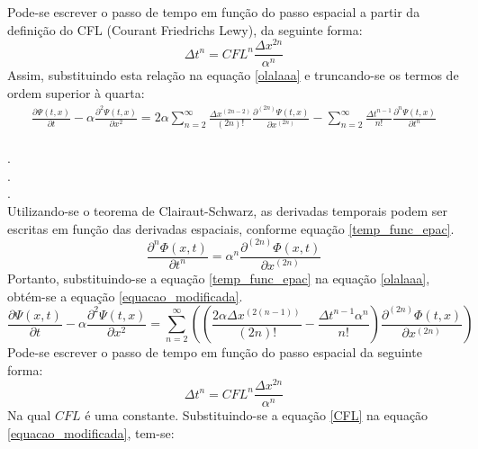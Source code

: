 \documentclass[10pt,twoside,a4paper]{article}
\begin{document}
Pode-se escrever o passo de tempo em função do passo espacial a partir da definição do CFL (Courant Friedrichs Lewy), da seguinte forma:
\begin{equation} \label{CFL}
\Delta t^n= CFL^n \frac{\Delta x^{2n}}{\alpha^{n}}
\end{equation}
Assim, substituindo esta relação na equação \ref{olalaaa} e truncando-se os termos de ordem superior à quarta:
\begin{equation}\label{final mod}
\begin{split}
\frac{\partial \Psi \left(t, x\right) }{\partial t} -
\alpha \frac{\partial^2 \Psi \left(t, x\right) }{\partial x^2} 
= 
2 \alpha \sum\limits_{n=2}^{\infty} \frac{\Delta x^{\left(2n - 2\right)}}{\left(2n\right)!} \frac{\partial^{\left(2n\right)} \Psi \left(t, x\right)}{\partial x^{\left(2n\right)}}
- \sum\limits_{n=2}^{\infty} \frac{\Delta t^{n - 1}}{n!} \frac{\partial^{n} \Psi (t , x)}{\partial t^{n}}	
\end{split}
\end{equation}
\\
. \\ 
. \\
. \\
Utilizando-se o teorema de Clairaut-Schwarz, as derivadas temporais podem ser escritas em função das derivadas espaciais, conforme equação \ref{temp_func_epac}.
\begin{equation} \label{temp_func_epac}
\frac{\partial^{n} \Phi \left( x,t \right)}{\partial t^{n}} =  \alpha^{n} \frac{\partial^{\left(2n\right)} \Phi \left( x,t \right)}{\partial x^{\left(2n\right)}}
\end{equation}
Portanto, substituindo-se a equação \ref{temp_func_epac} na equação \ref{olalaaa}, obtém-se a equação \ref{equacao_modificada}.
\begin{equation} \label{equacao_modificada}
\frac{\partial \Psi \left( x,t \right)}{\partial t} - \alpha \frac{\partial^{2} \Psi \left(t, x\right)}{\partial x^{2}}= 
 \sum\limits_{n=2}^{\infty}\left( \left(\frac{ 2 \alpha \Delta x^{\left(2\left(n-1\right)\right)}}{\left(2n\right)!} -\frac{\Delta t^{n-1} \alpha^{n}}{n!}\right) \frac{\partial^{\left(2n\right)} \Phi \left(t, x\right)}{\partial x^{\left(2n\right)}}\right)
\end{equation}
Pode-se escrever o passo de tempo em função do passo espacial da seguinte forma:
\begin{equation} 
\Delta t^n= CFL^n \frac{\Delta x^{2n}}{\alpha^{n}}
\end{equation}
Na qual $CFL$ é uma constante. Substituindo-se a equação \ref{CFL} na equação \ref{equacao_modificada}, tem-se:
\end{document}
